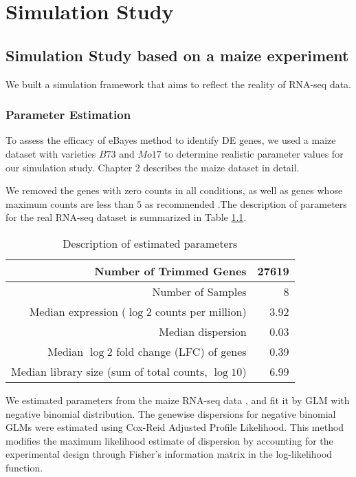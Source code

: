 \chapter{Simulation Study}

\section{Simulation Study based on a maize experiment}

We built a simulation framework that aims to reflect the reality of RNA-seq data. 

\subsection{Parameter Estimation}

To assess the efficacy of eBayes method to identify DE genes, we used a maize dataset with varieties $B73$ and $Mo17$ \citep{paschold2012complementation} to determine realistic parameter values for our simulation study. Chapter 2 describes the maize dataset in detail. 

We removed the genes with zero counts in all conditions, as well as genes whose maximum counts are less than $5$ as recommended \citep{rau2013data}.The description of parameters for the real RNA-seq dataset is summarized in Table \ref{tab:Parameter-Estimation}. 

\begin{table}[ht]
\centering
\begin{tabular}{|r|r|}
\hline
Number of Trimmed Genes & 27619 \\ 
\hline
Number of Samples & 8\\
\hline
  Median expression ($\log{2}$ counts per million) & 3.92 \\ 
  \hline
  Median dispersion & 0.03 \\ 
  \hline
  Median $\log{2}$ fold change (LFC) of genes & 0.39 \\ 
  \hline
  Median library size (sum of total counts, $\log{10}$) & 6.99 \\ 
   \hline
\end{tabular}

\caption{Description of estimated parameters}
\label{tab:Parameter-Estimation}


\end{table}

We estimated parameters from the maize RNA-seq data \citep{paschold2012complementation}, and fit it by GLM with negative binomial distribution. The genewise dispersions for negative binomial GLMs were estimated using Cox-Reid Adjusted Profile Likelihood\citep{mccarthy2012differential}. This method modifies the maximum likelihood estimate of dispersion by accounting for the experimental design through Fisher's information matrix in the log-likelihood function\citep{mccarthy2012differential}. 

